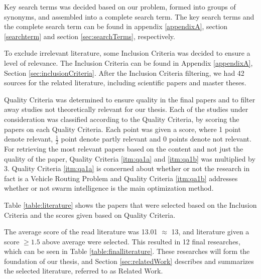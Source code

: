 Key search terms was decided based on our problem, formed into groups of synonyms, and assembled into a complete search term. The key search terms and the complete search term can be found in appendix \ref{appendixA}, section \vref{searchterm} and section \vref{sec:searchTerms}, respectively.

To exclude irrelevant literature, some Inclusion Criteria was decided to ensure a level of relevance. The Inclusion Criteria can be found in Appendix \ref{appendixA}, Section \vref{sec:inclusionCriteria}. After the Inclusion Criteria filtering, we had 42 sources for the related literature, including scientific papers and master theses. 

Quality Criteria was determined to ensure quality in the final papers and to filter away studies not theoretically relevant for our thesis. Each of the studies under consideration was classified according to the Quality Criteria, by scoring the papers on each Quality Criteria. Each point was given a score, where 1 point denote relevant, $\frac{1}{2}$ point denote partly relevant and 0 points denote not relevant. For retrieving the most relevant papers based on the content and not just the quality of the paper, Quality Criteria \ref{itm:qa1a} and \vref{itm:qa1b} was multiplied by 3. Quality Criteria \ref{itm:qa1a} is concerned about whether or not the research in fact is a Vehicle Routing Problem and Quality Criteria \ref{itm:qa1b} addresses whether or not swarm intelligence is the main optimization method. 

Table \vref{table:literature} shows the papers that were selected based on the Inclusion Criteria and the scores given based on Quality Criteria.

The average score of the read literature was 13.01 $\approx$ 13, and literature given a score $\geq{1.5}$ above average were selected. This resulted in 12 final researches, which can be seen in Table \vref{table:finalliterature}. These researches will form the foundation of our thesis, and Section \vref{sec:relatedWork} describes and summarizes the selected literature, referred to as Related Work. 
